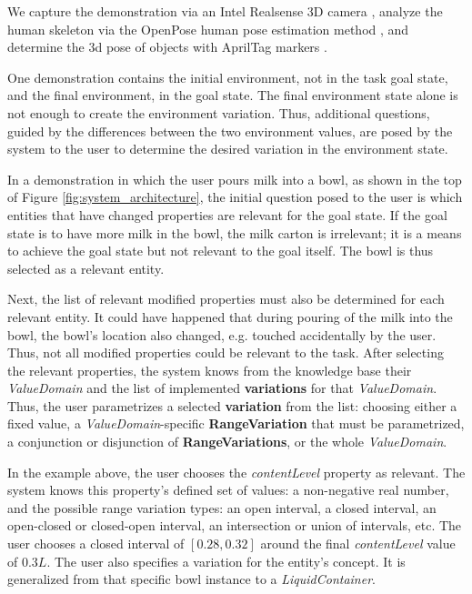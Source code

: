 We capture the demonstration via an Intel Realsense 3D camera \cite{realsense}, analyze the human skeleton via the OpenPose human pose estimation method \cite{openpose}, and determine the 3d pose of objects with AprilTag markers \cite{aprilTag}.

One demonstration contains the initial environment, not in the task goal state, and the final environment, in the goal state. The final environment state alone is not enough to create the environment variation. Thus, additional questions, guided by the differences between the two environment values, are posed by the system to the user to determine the desired variation in the environment state.

In a demonstration in which the user pours milk into a bowl, as shown in the top of Figure \ref{fig:system_architecture}, the initial question posed to the user is which entities that have changed properties are relevant for the goal state. If the goal state is to have more milk in the bowl, the milk carton is irrelevant; it is a means to achieve the goal state but not relevant to the goal itself. The bowl is thus selected as a relevant entity. 

Next, the list of relevant modified properties must also be determined for each relevant entity. It could have happened that during pouring of the milk into the bowl, the bowl's location also changed, e.g. touched accidentally by the user. Thus, not all modified properties could be relevant to the task. After selecting the relevant properties, the system knows from the knowledge base \cite{conceptHierarchyGeriatronicsSummit24} their \textit{ValueDomain} and the list of implemented \textbf{variations} for that \textit{ValueDomain}. Thus, the user parametrizes a selected \textbf{variation} from the list: choosing either a fixed value, a \textit{ValueDomain}-specific \textbf{RangeVariation} that must be parametrized, a conjunction or disjunction of \textbf{RangeVariations}, or the whole \textit{ValueDomain}.

In the example above, the user chooses the \textit{contentLevel} property as relevant. The system knows this property's defined set of values: a non-negative real number, and the possible range variation types: an open interval, a closed interval, an open-closed or closed-open interval, an intersection or union of intervals, etc. The user chooses a closed interval of $[0.28, 0.32]$ around the final \textit{contentLevel} value of $0.3L$. The user also specifies a variation for the entity's concept. It is generalized from that specific bowl instance to a \textit{LiquidContainer}.

